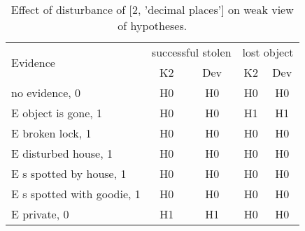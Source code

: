 \begin{table}\begin{tabular}{l|cc|cc}\toprule\multirow{2}{*}{Evidence} & \multicolumn{2}{c}{successful stolen}& \multicolumn{2}{c}{lost object}\\& {K2} & {Dev}& {K2} & {Dev}\\\midrule
no evidence, 0 & H0&H0&H0&H0\\E object is gone, 1 & H0&H0&H1&H1\\E broken lock, 1 & H0&H0&H0&H0\\E disturbed house, 1 & H0&H0&H0&H0\\E s spotted by house, 1 & H0&H0&H0&H0\\E s spotted with goodie, 1 & H0&H0&H0&H0\\E private, 0 & H1&H1&H0&H0\\\bottomrule\end{tabular}\caption{Effect of disturbance of [2, 'decimal places'] on weak view of hypotheses.}\end{table}